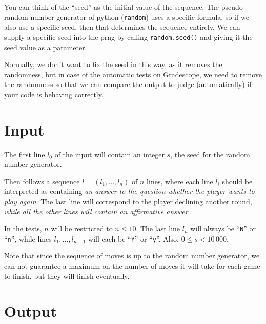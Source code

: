 You can think of the ``seed'' as the initial value of the sequence.
The pseudo random number generator of python (\texttt{random}) uses a specific formula,
so if we also use a specific seed, then that determines the sequence entirely.
We can supply a specific seed into the prng by calling \texttt{random.seed()}
and giving it the seed value as a parameter.

Normally, we don't want to fix the seed in this way, as it removes the randomness,
but in case of the automatic tests on Gradescope,
we need to remove the randomness so that we can compare the output
to judge (automatically) if your code is behaving correctly.


\pagebreak
\section*{Input}

The first line $l_0$ of the input will contain an integer $s$,
the seed for the random number generator.

Then follows a sequence $l = (l_1, \dots, l_n)$ of $n$ lines,
where each line $l_i$ should be interpreted as containing
\emph{an answer to the question whether the player wants to play again}.
The last line will correspond to the player declining another round,
\emph{while all the other lines will contain an affirmative answer}.

In the tests, $n$ will be restricted to $n \le 10$.
The last line $l_n$ will always be ``\texttt{N}'' or ``\texttt{n}'',
while lines $l_1, \dots, l_{n-1}$ will each be ``\texttt{Y}'' or ``\texttt{y}''.
Also, $0 \le s < 10\,000$.

Note that since the sequence of moves is up to the random number generator,
we can not guarantee a maximum
on the number of moves it will take for each game to finish,
but they will finish eventually.

\section*{Output}

